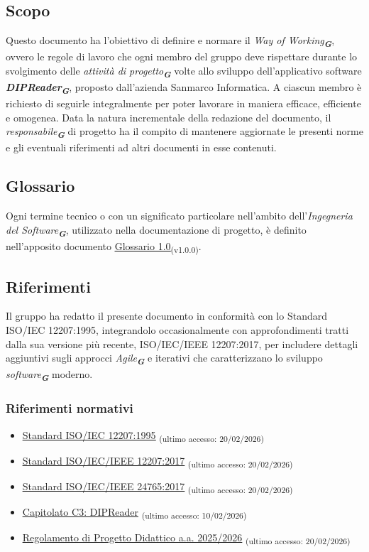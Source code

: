 \documentclass[a4paper,12pt]{article}
\newcommand{\glossario}[1]{\textit{#1}\textsubscript{\textbf{\textit{\textcolor{lightblack}{G}}}}}
\newcommand{\ped}[1]{\textsubscript{#1}}
\begin{document}
\subsection{Scopo}
Questo documento ha l'obiettivo di definire e normare il \glossario{Way of
    Working}, ovvero le regole di lavoro che ogni membro del gruppo deve rispettare
durante lo svolgimento delle \glossario{attività di progetto} volte allo
sviluppo dell'applicativo software \glossario{\textbf{DIPReader}}, proposto
dall'azienda Sanmarco Informatica. A ciascun membro è richiesto di seguirle
integralmente per poter lavorare in maniera efficace, efficiente e omogenea.
Data la natura incrementale della redazione del documento, il
\glossario{responsabile} di progetto ha il compito di mantenere aggiornate le
presenti norme e gli eventuali riferimenti ad altri documenti in esse
contenuti.
\subsection{Glossario}
Ogni termine tecnico o con un significato particolare nell'ambito
dell'\glossario{Ingegneria del Software}, utilizzato nella documentazione di
progetto, è definito nell'apposito documento
\href{https://7-zpus.github.io/Docs/assets/2_RTB/DocumentiInterni/Glossario.pdf}{\ul{Glossario
        1.0}}\ped{(v1.0.0)}.
\subsection{Riferimenti}
Il gruppo ha redatto il presente documento in conformità con lo Standard
ISO/IEC 12207:1995, integrandolo occasionalmente con approfondimenti tratti
dalla sua versione più recente, ISO/IEC/IEEE 12207:2017, per includere dettagli
aggiuntivi sugli approcci \glossario{\textit{Agile}} e iterativi che
caratterizzano lo sviluppo \glossario{software} moderno.
\subsubsection{Riferimenti normativi}
\begin{itemize}
    \item \href{https://www.math.unipd.it/~tullio/IS-1/2009/Approfondimenti/ISO_12207-1995.pdf}{\ul{Standard ISO/IEC 12207:1995}} \ped{(ultimo accesso: 20/02/2026)}
    \item \href{https://www.iso.org/standard/63712.html}{\ul{Standard ISO/IEC/IEEE 12207:2017}} \ped{(ultimo accesso: 20/02/2026)}
    \item \href{https://www.iso.org/standard/71952.html}{\ul{Standard ISO/IEC/IEEE 24765:2017}} \ped{(ultimo accesso: 20/02/2026)}
    \item \href{https://www.math.unipd.it/~tullio/IS-1/2025/Progetto/C3.pdf}{\ul{Capitolato C3: DIPReader}} \ped{(ultimo accesso: 10/02/2026)}
    \item \href{https://www.math.unipd.it/~tullio/IS-1/2025/Dispense/PD1.pdf}{\ul{Regolamento di Progetto Didattico a.a.
                  2025/2026}} \ped{(ultimo accesso: 20/02/2026)}
\end{itemize}
\end{document}

